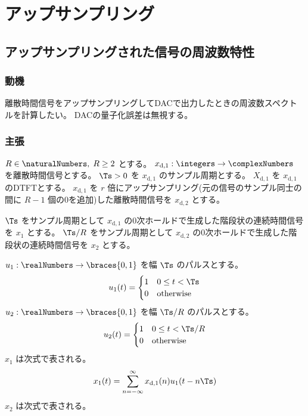 \chapter{アップサンプリング}
    \section{アップサンプリングされた信号の周波数特性}
        \newcommand{\xda}{x_{\text{d},1}}
        \newcommand{\Xda}{X_{\text{d},1}}
        \newcommand{\xdb}{x_{\text{d},2}}
        \subsection{動機}
            離散時間信号をアップサンプリングしてDACで出力したときの周波数スペクトルを計算したい。
            DACの量子化誤差は無視する。
        \subsection{主張}
            $R\in\naturalNumbers,\;R\geq 2$ とする。
            $\xda:\integers\to\complexNumbers$ を離散時間信号とする。
            $\Ts>0$ を $\xda$ のサンプル周期とする。
            $\Xda$ を $\xda$ のDTFTとする。
            $\xda$ を $r$ 倍にアップサンプリング(元の信号のサンプル同士の間に $R-1$ 個の0を追加)した離散時間信号を $\xdb$ とする。
            \par
            $\Ts$ をサンプル周期として $\xda$ の0次ホールドで生成した階段状の連続時間信号を $x_1$ とする。
            $\Ts/R$ をサンプル周期として $\xdb$ の0次ホールドで生成した階段状の連続時間信号を $x_2$ とする。
            \par
            $u_1:\realNumbers\to\braces{0,1}$ を幅 $\Ts$ のパルスとする。
            \[
                u_1(t) = \begin{cases}
                    1 & 0\leq t < \Ts \\
                    0 & \text{otherwise}
                \end{cases}
            \]
            $u_2:\realNumbers\to\braces{0,1}$ を幅 $\Ts/R$ のパルスとする。
            \[
                u_2(t) = \begin{cases}
                    1 & 0\leq t < \Ts/R \\
                    0 & \text{otherwise}
                \end{cases}
            \]
            $x_1$ は次式で表される。
            \[ x_1(t) = \sum_{n=-\infty}^\infty \xda(n)u_1(t-n\Ts) \]
            $x_2$ は次式で表される。
